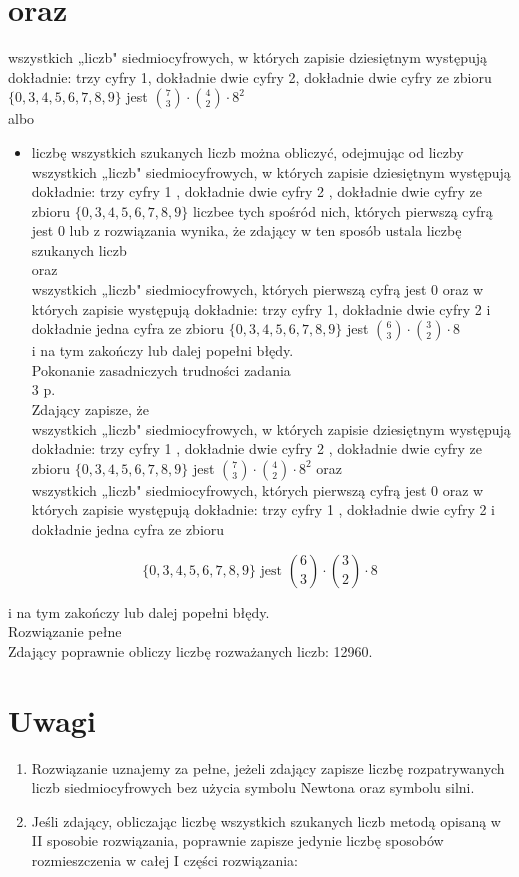 \documentclass[10pt]{article}
\begin{document}
\section*{oraz}
wszystkich „liczb" siedmiocyfrowych, w których zapisie dziesiętnym występują dokładnie: trzy cyfry 1, dokładnie dwie cyfry 2, dokładnie dwie cyfry ze zbioru $\{0,3,4,5,6,7,8,9\}$ jest $\binom{7}{3} \cdot\binom{4}{2} \cdot 8^{2}$\\
albo

\begin{itemize}
  \item liczbę wszystkich szukanych liczb można obliczyć, odejmując od liczby wszystkich „liczb" siedmiocyfrowych, w których zapisie dziesiętnym występują dokładnie: trzy cyfry 1 , dokładnie dwie cyfry 2 , dokładnie dwie cyfry ze zbioru $\{0,3,4,5,6,7,8,9\}$ liczbee tych spośród nich, których pierwszą cyfrą jest 0 lub z rozwiązania wynika, że zdający w ten sposób ustala liczbę szukanych liczb\\
oraz\\
wszystkich „liczb" siedmiocyfrowych, których pierwszą cyfrą jest 0 oraz w których zapisie występują dokładnie: trzy cyfry 1, dokładnie dwie cyfry 2 i dokładnie jedna cyfra ze zbioru $\{0,3,4,5,6,7,8,9\}$ jest $\binom{6}{3} \cdot\binom{3}{2} \cdot 8$\\
i na tym zakończy lub dalej popełni błędy.\\
Pokonanie zasadniczych trudności zadania\\
3 p.\\
Zdający zapisze, że\\
wszystkich „liczb" siedmiocyfrowych, w których zapisie dziesiętnym występują dokładnie: trzy cyfry 1 , dokładnie dwie cyfry 2 , dokładnie dwie cyfry ze zbioru $\{0,3,4,5,6,7,8,9\}$ jest $\binom{7}{3} \cdot\binom{4}{2} \cdot 8^{2}$ oraz\\
wszystkich „liczb" siedmiocyfrowych, których pierwszą cyfrą jest 0 oraz w których zapisie występują dokładnie: trzy cyfry 1 , dokładnie dwie cyfry 2 i dokładnie jedna cyfra ze zbioru
\end{itemize}

$$
\{0,3,4,5,6,7,8,9\} \text { jest }\binom{6}{3} \cdot\binom{3}{2} \cdot 8
$$

i na tym zakończy lub dalej popełni błędy.\\
Rozwiązanie pełne\\
Zdający poprawnie obliczy liczbę rozważanych liczb: 12960.

\section*{Uwagi}
\begin{enumerate}
  \item Rozwiązanie uznajemy za pełne, jeżeli zdający zapisze liczbę rozpatrywanych liczb siedmiocyfrowych bez użycia symbolu Newtona oraz symbolu silni.
  \item Jeśli zdający, obliczając liczbę wszystkich szukanych liczb metodą opisaną w II sposobie rozwiązania, poprawnie zapisze jedynie liczbę sposobów rozmieszczenia w całej I części rozwiązania:
\end{enumerate}
\end{document}
